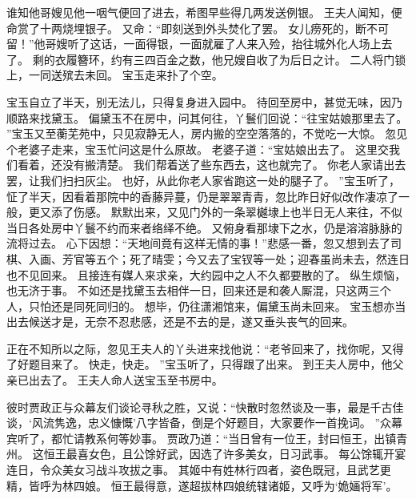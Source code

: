 谁知他哥嫂见他一咽气便回了进去，希图早些得几两发送例银。
王夫人闻知，便命赏了十两烧埋银子。
又命：“即刻送到外头焚化了罢。
女儿痨死的，断不可留！”他哥嫂听了这话，一面得银，一面就雇了人来入殓，抬往城外化人场上去了。
剩的衣履簪环，约有三四百金之数，他兄嫂自收了为后日之计。
二人将门锁上，一同送殡去未回。
宝玉走来扑了个空。
\par
宝玉自立了半天，别无法儿，只得复身进入园中。
待回至房中，甚觉无味，因乃顺路来找黛玉。
偏黛玉不在房中，问其何往，丫鬟们回说：“往宝姑娘那里去了。
”宝玉又至蘅芜苑中，只见寂静无人，房内搬的空空落落的，不觉吃一大惊。
忽见个老婆子走来，宝玉忙问这是什么原故。
老婆子道：“宝姑娘出去了。
这里交我们看着，还没有搬清楚。
我们帮着送了些东西去，这也就完了。
你老人家请出去罢，让我们扫扫灰尘。
也好，从此你老人家省跑这一处的腿子了。
”宝玉听了，怔了半天，因看着那院中的香藤异蔓，仍是翠翠青青，忽比昨日好似改作凄凉了一般，更又添了伤感。
默默出来，又见门外的一条翠樾埭上也半日无人来往，不似当日各处房中丫鬟不约而来者络绎不绝。
又俯身看那埭下之水，仍是溶溶脉脉的流将过去。
心下因想：“天地间竟有这样无情的事！”悲感一番，忽又想到去了司棋、入画、芳官等五个；死了晴雯；今又去了宝钗等一处；迎春虽尚未去，然连日也不见回来。
且接连有媒人来求亲，大约园中之人不久都要散的了。
纵生烦恼，也无济于事。
不如还是找黛玉去相伴一日，回来还是和袭人厮混，只这两三个人，只怕还是同死同归的。
想毕，仍往潇湘馆来，偏黛玉尚未回来。
宝玉想亦当出去候送才是，无奈不忍悲感，还是不去的是，遂又垂头丧气的回来。
\par
正在不知所以之际，忽见王夫人的丫头进来找他说：“老爷回来了，找你呢，又得了好题目来了。
快走，快走。
”宝玉听了，只得跟了出来。
到王夫人房中，他父亲已出去了。
王夫人命人送宝玉至书房中。
\par
彼时贾政正与众幕友们谈论寻秋之胜，又说：“快散时忽然谈及一事，最是千古佳谈，‘风流隽逸，忠义慷慨’八字皆备，倒是个好题目，大家要作一首挽词。
”众幕宾听了，都忙请教系何等妙事。
贾政乃道：“当日曾有一位王，封曰恒王，出镇青州。
这恒王最喜女色，且公馀好武，因选了许多美女，日习武事。
每公馀辄开宴连日，令众美女习战斗攻拔之事。
其姬中有姓林行四者，姿色既冠，且武艺更精，皆呼为林四娘。
恒王最得意，遂超拔林四娘统辖诸姬，又呼为‘姽婳将军’。
